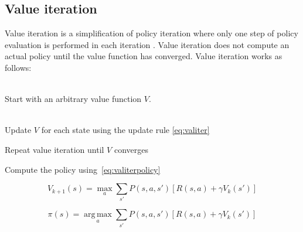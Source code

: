 \subsection{Value iteration}
\label{sec:valueiteration}

Value iteration is a simplification of policy iteration where only one step of
policy evaluation is performed in each iteration
\parencite{barto1998reinforcement}. Value iteration does not compute an actual
policy until the value function has converged. Value iteration works as follows:

\begin{description}
\item[Initialization] \hfill \\
    Start with an arbitrary value function $V$.
\item[Value iteration] \hfill \\
    Update $V$ for each state using the update rule \eqref{eq:valiter}
\item Repeat value iteration until $V$ converges
\item Compute the policy using~\eqref{eq:valiterpolicy}
\end{description}

\begin{equation} \label{eq:valiter}
V_{k+1}(s) = \max_a \sum_{s'}{P(s, a, s') \left[R(s, a) + \gamma V_k(s')\right]}
\end{equation}

\begin{equation} \label{eq:valiterpolicy}
\pi(s) = \operatorname*{arg\,max}_a \sum_{s'}{P(s, a, s') \left[R(s, a) + \gamma V_k(s')\right]}
\end{equation}
